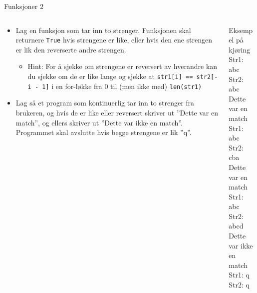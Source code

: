 \documentclass[screen, aspectratio=169]{beamer}
\begin{document}
\begin{frame}{Funksjoner 2}
	\begin{columns}
		\begin{column}{.6\textwidth}
			\begin{itemize}
				\item Lag en funksjon som tar inn to strenger. Funksjonen skal returnere \lstinline|True| hvis strengene er like, eller hvis den ene strengen er lik den reverserte andre strengen.
				\begin{itemize}
					\item Hint: For å sjekke om strengene er reversert av hverandre kan du sjekke om de er like lange og sjekke at \lstinline|str1[i] == str2[-i - 1]| i en for-løkke fra 0 til (men ikke med) \lstinline|len(str1)|
				\end{itemize}
				\item Lag så et program som kontinuerlig tar inn to strenger fra brukeren, og hvis de er like eller reversert skriver ut ''Dette var en match'', og ellers skriver ut ''Dette var ikke en match''. Programmet skal avslutte hvis begge strengene er lik ''q''.
			\end{itemize}
		\end{column}
		\begin{column}{.4\textwidth}
			\begin{exampleblock}{Eksempel på kjøring}
				Str1: \textcolor{input-color}{abc}\\
				Str2: \textcolor{input-color}{abc}\\
				Dette var en match\\
				Str1: \textcolor{input-color}{abc}\\
				Str2: \textcolor{input-color}{cba}\\
				Dette var en match\\
				Str1: \textcolor{input-color}{abc}\\
				Str2: \textcolor{input-color}{abcd}\\
				Dette var ikke en match\\
				Str1: \textcolor{input-color}{q}\\
				Str2: \textcolor{input-color}{q}
			\end{exampleblock}
		\end{column}
	\end{columns}
\end{frame}
\end{document}
